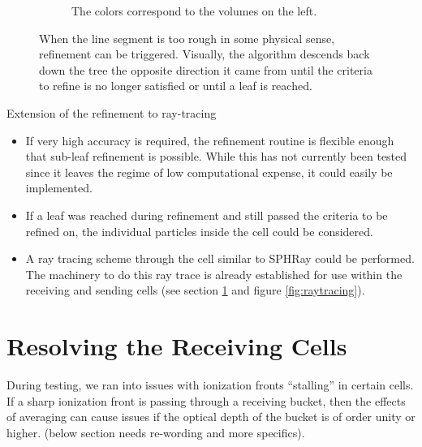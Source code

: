 \begin{figure}
\begin{subfigure}[b]{0.45\textwidth}
                \caption{The colors correspond to the volumes on the left.}
                \label{fig:refinememory}
        \end{subfigure}
        \caption[Refinement during the absorption algorithm.]{When the line segment is too rough in some physical sense, refinement can be triggered. Visually, the algorithm descends back down the tree the opposite direction it came from until the criteria to refine is no longer satisfied or until a leaf is reached.}\label{fig:refining}
\end{figure}



Extension of the refinement to ray-tracing
\begin{itemize}
\item If very high accuracy is required, the refinement routine is flexible enough that sub-leaf refinement is possible. While this has not currently been tested since it leaves the regime of low computational expense, it could easily be implemented.
\item If a leaf was reached during refinement and still passed the criteria to be refined on, the individual particles inside the cell could be considered.
\item A ray tracing scheme through the cell similar to SPHRay \citep{altayEt08} could be performed. The machinery to do this ray trace is already established for use within the receiving and sending cells (see section \ref{sec:resolvingleaves} and figure \ref{fig:raytracing}).
\end{itemize}

\section{Resolving the Receiving Cells}
\label{sec:resolvingleaves}

During testing, we ran into issues with ionization fronts ``stalling'' in certain cells. If a sharp ionization front is passing through a receiving bucket, then the effects of averaging can cause issues if the optical depth of the bucket is of order unity or higher. (below section needs re-wording and more specifics).

